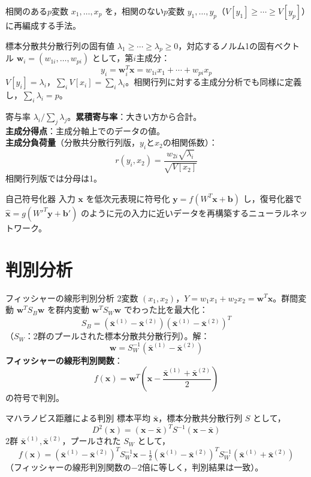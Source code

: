 \documentclass[a4paper,11pt]{ltjsarticle}
\begin{document}
相関のある$p$変数 $x_1,\dots,x_p$ を，相関のない$p$変数 $y_1,\dots,y_p$（$V[y_1]\ge\cdots\ge V[y_p]$）に再編成する手法。

\noindent 標本分散共分散行列の固有値 $\lambda_1\ge\cdots\ge\lambda_p\ge0$，対応するノルム1の固有ベクトル $\bm w_i=(w_{1i},\dots,w_{pi})$ として，第$i$主成分：
\[
y_i = \bm w_i^T\bm x = w_{1i}x_1+\cdots+w_{pi}x_p
\]
$V[y_i]=\lambda_i$，$\sum_i V[x_i] = \sum_i\lambda_i$。相関行列に対する主成分分析でも同様に定義し，$\sum_i\lambda_i=p$。

\begin{term}{寄与率}
$\lambda_i/\sum_j\lambda_j$。\textbf{累積寄与率}：大きい方から合計。\\
\textbf{主成分得点}：主成分軸上でのデータの値。\\
\textbf{主成分負荷量}（分散共分散行列版，$y_i$と$x_2$の相関係数）：
\[
r(y_i,x_2) = \frac{w_{2i}\sqrt{\lambda_i}}{\sqrt{V[x_2]}}
\]
相関行列版では分母は1。
\end{term}

\begin{term}{自己符号化器}
入力 $\bm x$ を低次元表現に符号化 $\bm y=f(W^T\bm x+\bm b)$ し，復号化器で $\hat{\bm x}=g(W'^T\bm y+\bm b')$ のように元の入力に近いデータを再構築するニューラルネットワーク。
\end{term}

\section{判別分析}

\begin{term}{フィッシャーの線形判別分析}
2変数 $(x_1,x_2)$，$Y=w_1x_1+w_2x_2=\bm w^T\bm x$。群間変動 $\bm w^TS_B\bm w$ を群内変動 $\bm w^TS_W\bm w$ でわった比を最大化：
\[
S_B = (\bar{\bm x}^{(1)}-\bar{\bm x}^{(2)})(\bar{\bm x}^{(1)}-\bar{\bm x}^{(2)})^T
\]
（$S_W$：2群のプールされた標本分散共分散行列）。解：
\[
\bm w = S_W^{-1}(\bar{\bm x}^{(1)}-\bar{\bm x}^{(2)})
\]
\textbf{フィッシャーの線形判別関数}：
\[
f(\bm x) = \bm w^T\left(\bm x - \frac{\bar{\bm x}^{(1)}+\bar{\bm x}^{(2)}}{2}\right)
\]
の符号で判別。
\end{term}

\begin{term}{マハラノビス距離による判別}
標本平均 $\bar{\bm x}$，標本分散共分散行列 $S$ として，
\[
D^2(\bm x) = (\bm x-\bar{\bm x})^T S^{-1}(\bm x-\bar{\bm x})
\]
2群 $\bar{\bm x}^{(1)},\bar{\bm x}^{(2)}$，プールされた $S_W$ として，
\[
f(\bm x) = (\bar{\bm x}^{(1)}-\bar{\bm x}^{(2)})^T S_W^{-1}\bm x - \tfrac12(\bar{\bm x}^{(1)}-\bar{\bm x}^{(2)})^T S_W^{-1}(\bar{\bm x}^{(1)}+\bar{\bm x}^{(2)})
\]
（フィッシャーの線形判別関数の$-2$倍に等しく，判別結果は一致）。
\end{term}
\end{document}
